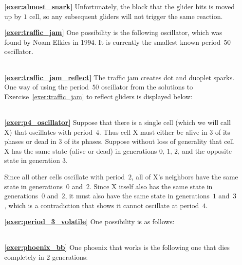 \begin{multicols}{2}
\begin{itemize}[leftmargin=0em]
	
	\item[\bf\color{ocre}\sffamily\ref{exer:almost_snark}] Unfortunately, the block that the glider hits is moved up by $1$ cell, so any subsequent gliders will not trigger the same reaction. \\
	
	
	\item[\bf\color{ocre}\sffamily\ref{exer:traffic_jam}] One possibility is the following oscillator, which was found by Noam Elkies in 1994. It is currently the smallest known period~$50$ oscillator. \\[-0.6em]
	
	 \\


	\item[\bf\color{ocre}\sffamily\ref{exer:traffic_jam_reflect}] The traffic jam creates dot and duoplet sparks. One way of using the period~$50$ oscillator from the solutions to Exercise~\ref{exer:traffic_jam} to reflect gliders is displayed below: \\[-0.6em]
	
	 \\
	
	
	\item[\bf\color{ocre}\sffamily\ref{exer:p4_oscillator}] Suppose that there is a single cell (which we will call X) that oscillates with period~$4$. Thus cell X must either be alive in $3$ of its phases or dead in $3$ of its phases. Suppose without loss of generality that cell X has the same state (alive or dead) in generations $0$, $1$, $2$, and the opposite state in generation $3$.
	
	Since all other cells oscillate with period~$2$, all of X's neighbors have the same state in generations~$0$ and~$2$. Since X itself also has the same state in generations~$0$ and~$2$, it must also have the same state in generations~$1$ and~$3$, which is a contradiction that shows it cannot oscillate at period~$4$. \\
	
	
	\item[\bf\color{ocre}\sffamily\ref{exer:period_3_volatile}] One possibility is as follows: \\[-0.6em]
	
	 \\
	
	
	\item[\bf\color{ocre}\sffamily\ref{exer:phoenix_bb}] One phoenix that works is the following one that dies completely in $2$ generations: \\[-0.6em]
	
	 \\
\end{itemize}
\end{multicols}



